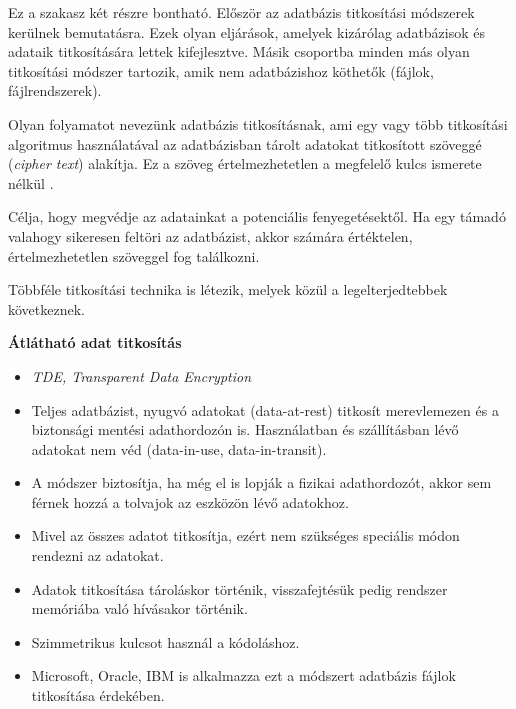 
Ez a szakasz két részre bontható. Először az adatbázis titkosítási módszerek kerülnek bemutatásra. Ezek olyan  eljárások, amelyek kizárólag adatbázisok és adataik titkosítására lettek kifejlesztve. Másik csoportba minden más olyan titkosítási módszer tartozik, amik nem adatbázishoz köthetők (fájlok, fájlrendszerek).


Olyan folyamatot nevezünk adatbázis titkosításnak, ami egy vagy több titkosítási algoritmus használatával az adatbázisban tárolt adatokat titkosított szöveggé (\textit{cipher text}) alakítja. Ez a szöveg értelmezhetetlen a megfelelő kulcs ismerete nélkül \cite{bouganim2009database}.

Célja, hogy megvédje az adatainkat a potenciális fenyegetésektől. Ha egy támadó valahogy sikeresen feltöri az adatbázist, akkor számára értéktelen, értelmezhetetlen szöveggel fog találkozni.

Többféle titkosítási technika is létezik, melyek közül a legelterjedtebbek következnek.

\bigskip

\noindent\textbf{Átlátható adat titkosítás}
\begin{itemize}
	\item \textit{TDE, Transparent Data Encryption}
	\item Teljes adatbázist, nyugvó adatokat (data-at-rest) titkosít merevlemezen és a biztonsági mentési adathordozón is. Használatban és szállításban lévő adatokat nem véd (data-in-use, data-in-transit).
	\item A módszer biztosítja, ha még el is lopják a fizikai adathordozót, akkor sem férnek hozzá a tolvajok az eszközön lévő adatokhoz.
	\item Mivel az összes adatot titkosítja, ezért nem szükséges speciális módon rendezni az adatokat.
	\item Adatok titkosítása tároláskor történik, visszafejtésük pedig rendszer memóriába való hívásakor történik.
	\item Szimmetrikus kulcsot használ a kódoláshoz.
	\item Microsoft, Oracle, IBM is alkalmazza ezt a módszert adatbázis fájlok titkosítása érdekében.
\end{itemize}

\bigskip

